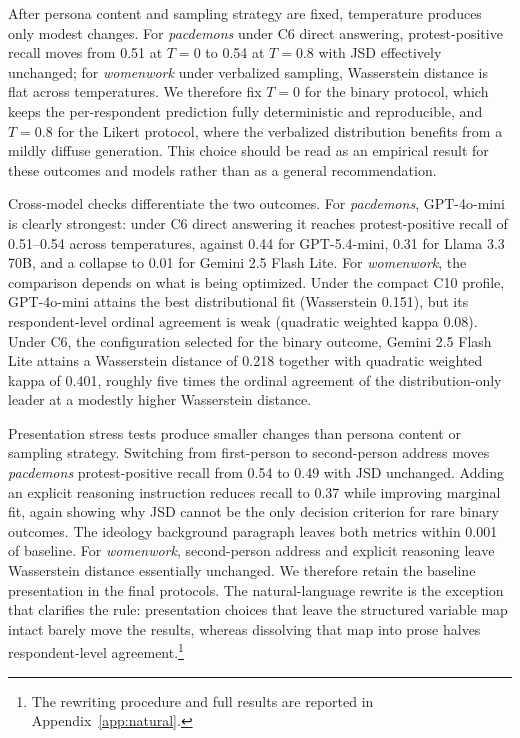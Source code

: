 After persona content and sampling strategy are fixed, temperature produces
only modest changes. For \textit{pacdemons} under C6 direct answering,
protest-positive recall moves from 0.51 at $T=0$ to 0.54 at $T=0.8$ with
JSD effectively unchanged; for \textit{womenwork} under verbalized
sampling, Wasserstein distance is flat across temperatures. We therefore
fix $T=0$ for the binary protocol, which keeps the per-respondent
prediction fully deterministic and reproducible, and $T=0.8$ for the Likert
protocol, where the verbalized distribution benefits from a mildly diffuse
generation. This choice should be read as an empirical result for these
outcomes and models rather than as a general recommendation.

Cross-model checks differentiate the two outcomes. For \textit{pacdemons},
GPT-4o-mini is clearly strongest: under C6 direct answering it reaches
protest-positive recall of 0.51--0.54 across temperatures, against 0.44
for GPT-5.4-mini, 0.31 for Llama 3.3 70B, and a collapse to 0.01 for
Gemini 2.5 Flash Lite. For \textit{womenwork}, the comparison depends on
what is being optimized. Under the compact C10 profile, GPT-4o-mini attains
the best distributional fit (Wasserstein 0.151), but its respondent-level
ordinal agreement is weak (quadratic weighted kappa 0.08). Under C6, the
configuration selected for the binary outcome, Gemini 2.5 Flash Lite
attains a Wasserstein distance of 0.218 together with quadratic weighted
kappa of 0.401, roughly five times the ordinal agreement of the
distribution-only leader at a modestly higher Wasserstein distance.

Presentation stress tests produce smaller changes than persona content or
sampling strategy. Switching from first-person to second-person address
moves \textit{pacdemons} protest-positive recall from 0.54 to 0.49 with
JSD unchanged. Adding an explicit reasoning instruction reduces recall to
0.37 while improving marginal fit, again showing why JSD cannot be the only
decision criterion for rare binary outcomes. The ideology background
paragraph leaves both metrics within 0.001 of baseline. For
\textit{womenwork}, second-person address and explicit reasoning leave
Wasserstein distance essentially unchanged. We therefore retain the
baseline presentation in the final protocols. The natural-language rewrite
is the exception that clarifies the rule: presentation choices that leave
the structured variable map intact barely move the results, whereas
dissolving that map into prose halves respondent-level
agreement.\footnote{The rewriting procedure and full results are reported
in Appendix~\ref{app:natural}.}

